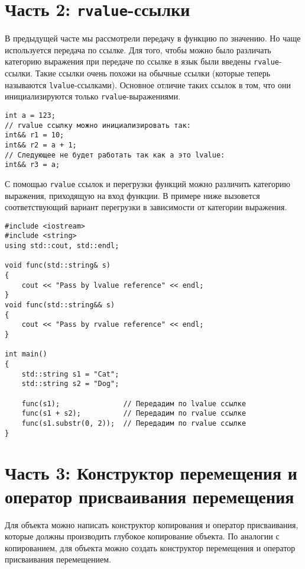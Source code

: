 \documentclass{article}
\begin{document}
\newpage
\section*{Часть 2: \texttt{rvalue}-ссылки}
В предыдущей часте мы рассмотрели передачу в функцию по значению. Но чаще используется передача по ссылке. Для того, чтобы можно было различать категорию выражения при передаче по ссылке в язык были введены \texttt{rvalue}-ссылки. Такие ссылки очень похожи на обычные ссылки (которые теперь называются \texttt{lvalue}-ссылками). Основное отличие таких ссылок в том, что они инициализируются только \texttt{rvalue}-выражениями.

\begin{lstlisting}
int a = 123;
// rvalue ссылку можно инициализировать так:
int&& r1 = 10;
int&& r2 = a + 1;
// Следующее не будет работать так как a это lvalue:
int&& r3 = a; 
\end{lstlisting}


С помощью \texttt{rvalue} ссылок и перегрузки функций можно различить категорию выражения, приходящую на вход функции. В примере ниже вызовется соответствующий вариант перегрузки в зависимости от категории выражения.
\begin{lstlisting}
#include <iostream>
#include <string>
using std::cout, std::endl;

void func(std::string& s)
{
    cout << "Pass by lvalue reference" << endl;
}
void func(std::string&& s)
{
    cout << "Pass by rvalue reference" << endl;
}

int main() 
{
    std::string s1 = "Cat";
    std::string s2 = "Dog";

    func(s1);               // Передадим по lvalue ссылке
    func(s1 + s2);          // Передадим по rvalue ссылке
    func(s1.substr(0, 2));  // Передадим по rvalue ссылке
}
\end{lstlisting}

\newpage
\section*{Часть 3: Конструктор перемещения и оператор присваивания перемещения}
Для объекта можно написать конструктор копирования и оператор присваивания, которые должны производить глубокое копирование объекта. По аналогии с копированием, для объекта можно создать конструктор перемещения и оператор присваивания перемещением.

\newpage
\end{document}
